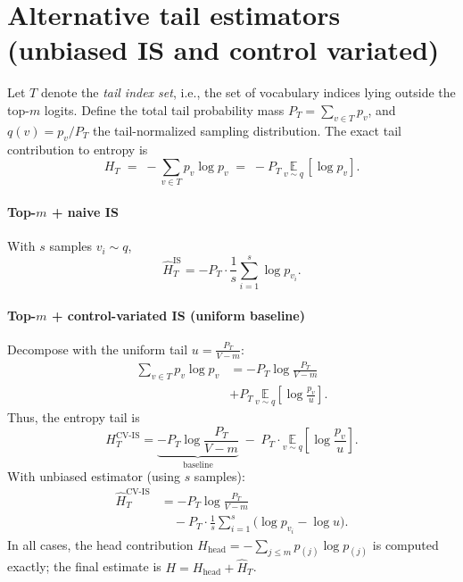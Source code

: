 \documentclass[11pt]{article}
\begin{document}
\section{Alternative tail estimators (unbiased IS and control variated)}
\label{app:tail-IS}
Let \(T\) denote the \emph{tail index set}, i.e., the set of vocabulary indices lying outside the top-\(m\) logits.
Define the total tail probability mass $P_T=\sum_{v\in T}p_v$, and $q(v)=p_v/P_T$ the tail-normalized sampling distribution. The exact tail contribution to entropy is
\[
	H_T \;=\; -\sum_{v\in T} p_v \log p_v \;=\; -P_T\,\underset{v\sim q}{\mathbb{E}}\,[\log p_v].
\]
\paragraph{Top-$m$ + naive IS} With $s$ samples $v_i\!\sim q$,
\[
	\widehat{H}_T^{\text{IS}}
	= -P_T \cdot \frac{1}{s}\sum_{i=1}^s \log p_{v_i}.
\]
\paragraph{Top-$m$ + control-variated IS (uniform baseline)}
Decompose with the uniform tail $u=\tfrac{P_T}{V-m}$:
\begin{align*}
	\sum_{v\in T} p_v \log p_v
	 & = -P_T\log\!\frac{P_T}{V-m}                                               \\
	 & + P_T\,\underset{v\sim q}{\mathbb{E}}\!\left[\log\!\frac{p_v}{u}\right].
\end{align*}
Thus, the entropy tail is
\[
	H_T^{\text{CV-IS}}
	= \underbrace{-P_T\log\!\frac{P_T}{V-m}}_{\text{baseline}}
	\;-\; P_T \cdot \underset{v\sim q}{\mathbb{E}}\!\left[\log\!\frac{p_v}{u}\right].
\]
With unbiased estimator (using $s$ samples):
\begin{align*}
	\widehat{H}_T^{\text{CV-IS}}
	 & = -P_T\log\!\frac{P_T}{V-m}                                                 \\
	 & \quad - P_T \cdot \frac{1}{s}\sum_{i=1}^s \Big(\log p_{v_i} - \log u\Big).
\end{align*}
In all cases, the head contribution $H_{\text{head}}=-\sum_{j\le m}p_{(j)}\log p_{(j)}$ is computed exactly; the final estimate is $H=H_{\text{head}}+\widehat{H}_T$.
\end{document}
